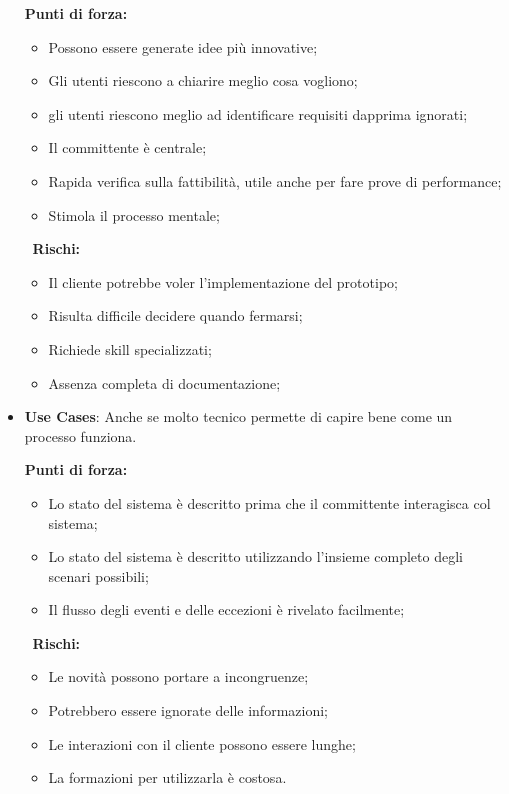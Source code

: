 \begin{itemize}
	\begin{info}[]
		\textbf{Punti di forza:}
		\begin{itemize}
			\item Possono essere generate idee più innovative;
			\item Gli utenti riescono a chiarire meglio cosa vogliono;
			\item gli utenti riescono meglio ad identificare requisiti dapprima ignorati;
			\item Il committente è centrale;
			\item Rapida verifica sulla fattibilità, utile anche per fare prove di performance;
			\item Stimola il processo mentale;
		\end{itemize}
		$\;\;$\textbf{Rischi:}
		\begin{itemize}
			\item Il cliente potrebbe voler l'implementazione del prototipo;
			\item Risulta difficile decidere quando fermarsi;
			\item Richiede skill specializzati;
			\item Assenza completa di documentazione;
		\end{itemize} 
	\end{info}
	\item \textbf{Use Cases}: Anche se molto tecnico permette di capire bene come un processo funziona.
	\begin{info}[]
		\textbf{Punti di forza:}
		\begin{itemize}
			\item Lo stato del sistema è descritto prima che il committente interagisca col sistema;
			\item Lo stato del sistema è descritto utilizzando l'insieme completo degli scenari possibili;
			\item Il flusso degli eventi e delle eccezioni è rivelato facilmente;
		\end{itemize}
		$\;\;$\textbf{Rischi:}
		\begin{itemize}
			\item Le novità possono portare a incongruenze;
			\item Potrebbero essere ignorate delle informazioni;
			\item Le interazioni con il cliente possono essere lunghe;
			\item La formazioni per utilizzarla è costosa.
		\end{itemize}
	\end{info}
\end{itemize}
